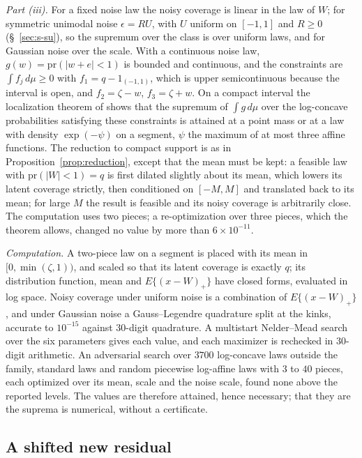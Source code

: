 \documentclass[12pt]{article}
\renewcommand{\_}{\usc\allowbreak}
\theoremstyle{definition}
\numberwithin{equation}{section}
\newcommand{\pr}{\mathrm{pr}}
\begin{document}
\emph{Part (iii).} For a fixed noise law the noisy coverage is linear in the law of $W$; for symmetric unimodal noise $\epsilon = RU$, with $U$ uniform on $[-1, 1]$ and $R \ge 0$ (\S~\ref{sec:s-su}), so the supremum over the class is over uniform laws, and for Gaussian noise over the scale. With a continuous noise law, $g(w) = \pr(|w + e| < 1)$ is bounded and continuous, and the constraints are $\int f_j\,d\mu \ge 0$ with $f_1 = q - 1_{(-1, 1)}$, which is upper semicontinuous because the interval is open, and $f_2 = \zeta - w$, $f_3 = \zeta + w$. On a compact interval the localization theorem of \citet{fradelizi2006} shows that the supremum of $\int g\,d\mu$ over the log-concave probabilities satisfying these constraints is attained at a point mass or at a law with density $\exp(-\psi)$ on a segment, $\psi$ the maximum of at most three affine functions. The reduction to compact support is as in Proposition~\ref{prop:reduction}, except that the mean must be kept: a feasible law with $\pr(|W| < 1) = q$ is first dilated slightly about its mean, which lowers its latent coverage strictly, then conditioned on $[-M, M]$ and translated back to its mean; for large $M$ the result is feasible and its noisy coverage is arbitrarily close. The computation uses two pieces; a re-optimization over three pieces, which the theorem allows, changed no value by more than $6 \times 10^{-11}$.

\emph{Computation.} A two-piece law on a segment is placed with its mean in $[0, \min(\zeta, 1))$, and scaled so that its latent coverage is exactly $q$; its distribution function, mean and $E\{(x - W)_+\}$ have closed forms, evaluated in log space. Noisy coverage under uniform noise is a combination of $E\{(x - W)_+\}$, and under Gaussian noise a Gauss--Legendre quadrature split at the kinks, accurate to $10^{-15}$ against $30$-digit quadrature. A multistart Nelder--Mead search over the six parameters gives each value, and each maximizer is rechecked in $30$-digit arithmetic. An adversarial search over $3700$ log-concave laws outside the family, standard laws and random piecewise log-affine laws with $3$ to $40$ pieces, each optimized over its mean, scale and the noise scale, found none above the reported levels. The values are therefore attained, hence necessary; that they are the suprema is numerical, without a certificate.

\subsection{A shifted new residual}\label{sec:s-shift}
\end{document}
